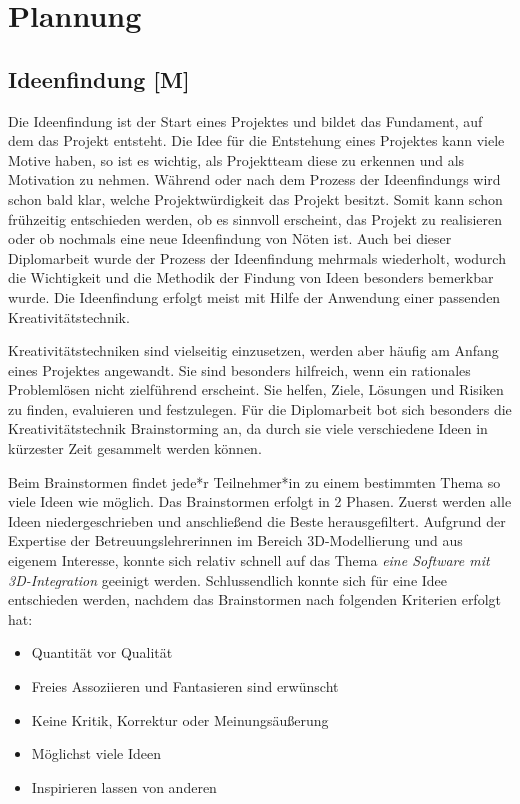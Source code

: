\section{Plannung}

\subsection{Ideenfindung [M]}
Die Ideenfindung ist der Start eines Projektes und bildet das Fundament, auf dem das Projekt entsteht. Die Idee für die Entstehung eines Projektes kann viele Motive haben, so ist es wichtig, als Projektteam diese zu erkennen und als Motivation zu nehmen. Während oder nach dem Prozess der Ideenfindungs wird schon bald klar, welche Projektwürdigkeit das Projekt besitzt. Somit kann schon frühzeitig entschieden werden, ob es sinnvoll erscheint, das Projekt zu realisieren oder ob nochmals eine neue Ideenfindung von Nöten ist. Auch bei dieser Diplomarbeit wurde der Prozess der Ideenfindung mehrmals wiederholt, wodurch die Wichtigkeit und die Methodik der Findung von Ideen besonders bemerkbar wurde. Die Ideenfindung erfolgt meist mit Hilfe der Anwendung einer passenden Kreativitätstechnik.

Kreativitätstechniken sind vielseitig einzusetzen, werden aber häufig am Anfang eines Projektes angewandt. Sie sind besonders hilfreich, wenn ein rationales Problemlösen nicht zielführend erscheint. Sie helfen, Ziele, Lösungen und Risiken zu finden, evaluieren und festzulegen. Für die Diplomarbeit bot sich besonders die Kreativitätstechnik Brainstorming an, da durch sie viele verschiedene Ideen in kürzester Zeit gesammelt werden können.

Beim Brainstormen findet jede*r Teilnehmer*in zu einem bestimmten Thema so viele Ideen wie möglich. Das Brainstormen erfolgt in 2 Phasen. Zuerst werden alle Ideen niedergeschrieben und anschließend die Beste herausgefiltert. Aufgrund der Expertise der Betreuungslehrerinnen im Bereich 3D-Modellierung und aus eigenem Interesse, konnte sich relativ schnell auf das Thema \emph{eine Software mit 3D-Integration} geeinigt werden. Schlussendlich konnte sich für eine Idee entschieden werden, nachdem das Brainstormen nach folgenden Kriterien erfolgt hat:
\begin{itemize}
    \item Quantität vor Qualität
    \item Freies Assoziieren und Fantasieren sind erwünscht
    \item Keine Kritik, Korrektur oder Meinungsäußerung
    \item Möglichst viele Ideen
    \item Inspirieren lassen von anderen
\end{itemize}

